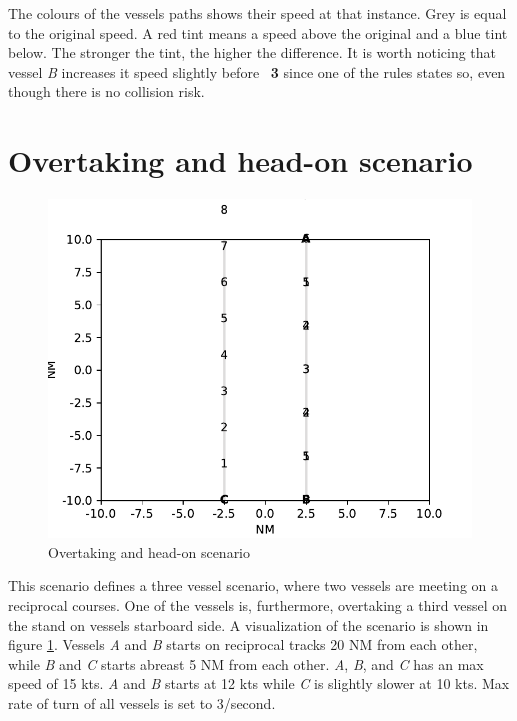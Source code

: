 The colours of the vessels paths shows their speed at that instance. Grey is equal to the original speed. A red tint means a speed above the original and a blue tint below. The stronger the tint, the higher the difference. It is worth noticing that vessel \textit{B} increases it speed slightly before  \textbf{3} since one of the rules states so, even though there is no collision risk.
\section{Overtaking and head-on scenario}%
\begin{figure}[h]
    \centering
    \includegraphics[width=\textwidth,height=0.75\textheight,keepaspectratio]{Figures/Scenario/overtaking-and-head-on.pdf}
    \caption{Overtaking and head-on scenario  \cite{ecolreg_overtaking-and-head-on}}
    \label{fig:overtaking-and-head-on}
\end{figure}
This scenario defines a three vessel scenario, where two vessels are meeting on a reciprocal courses. One of the vessels is, furthermore, overtaking a third vessel on the stand on vessels starboard side. A visualization of the scenario is shown in figure \ref{fig:overtaking-and-head-on}. Vessels \textit{A} and \textit{B} starts on reciprocal tracks 20 NM from each other, while \textit{B} and \textit{C} starts abreast 5 NM from each other. \textit{A}, \textit{B}, and \textit{C} has an max speed of 15 kts. \textit{A} and \textit{B} starts at 12 kts while \textit{C} is slightly slower at 10 kts. Max rate of turn of all vessels is set to 3\textdegree/second.

